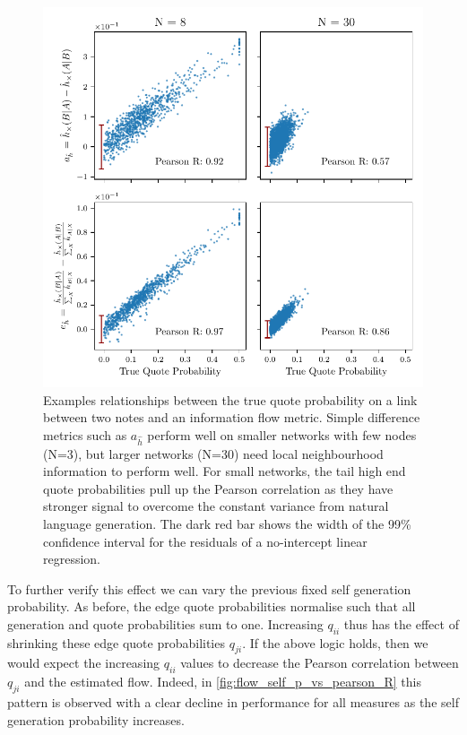 \begin{figure}[!htbp]
	\centering
	\includegraphics{chapter3/figs/scatterplot_comparison.pdf}
	\caption{Examples relationships between the true quote probability on a link between two notes and an information flow metric. Simple difference metrics such as $a_{\hat{h}}$ perform well on smaller networks with few nodes (N=3), but larger networks (N=30) need local neighbourhood information to perform well. For small networks, the tail high end quote probabilities pull up the Pearson correlation as they have stronger signal to overcome the constant variance from natural language generation. The {\color{red!40!black}dark red} bar shows the width of the 99\% confidence interval for the residuals of a no-intercept linear regression.}
	\label{fig:flow_quote_scatterplot}
\end{figure}

To further verify this effect we can vary the previous fixed self generation probability. As before, the edge quote probabilities normalise such that all generation and quote probabilities sum to one. Increasing $q_{ii}$ thus has the effect of shrinking these edge quote probabilities $q_{ji}$. If the above logic holds, then we would expect the increasing $q_{ii}$ values to decrease the Pearson correlation between $q_{ji}$ and the estimated flow. Indeed, in \autoref{fig:flow_self_p_vs_pearson_R} this pattern is observed with a clear decline in performance for all measures as the self generation probability increases. 



